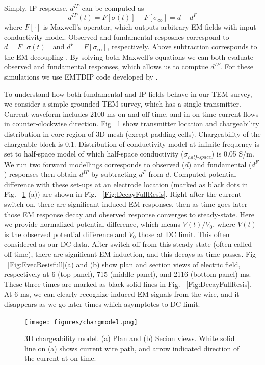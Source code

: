 \documentclass[letterpaper,11pt]{article}
\newcommand{\siginf}{\sigma_\infty}
\newcommand{\dip}{d^{IP}}
\begin{document}
Simply, IP response, $\dip$ can be computed as 
\begin{equation}
  \dip(t) = F[\sigma(t)] - F[\siginf] = d-d^F
\end{equation}
where $F[\cdot]$ is Maxwell's operator, which outputs arbitrary EM fields with input conductivity model. Observed and fundamental resposnes correspond to $d=F[\sigma(t)]$ and $d^F=F[\siginf]$, respectively. 
Above subtraction corresponds to the EM decoupling \cite[]{Pelton1978,routh2001}. By solving both Maxwell’s equations we can both evaluate observed and fundamental responses, which allows us to comptue $\dip$. For these simulations we use EMTDIP code developed by \cite{Marchant2014}. 

To understand how both fundamental and IP fields behave in our TEM survey, we consider a simple grounded TEM survey, which has a single transmitter. Current waveform includes 2100 ms on and off time, and in on-time current flows in counter-clockwise direction. Fig ~\ref{Fig:chargmodel} show transmitter location and chargeability distribution in core region of 3D mesh (except padding cells). Chargeability of the chargeable block is 0.1. Distribution of conductivity model at infinite frequency is set to half-space model of which half-space conductivity ($\sigma_{half\text{-}space}$) is 0.05 S/m. We run two forward modellings corresponds to observed ($d$) and fundamental ($d^F$) responses then obtain $\dip$ by subtracting $d^F$  from $d$. Computed potential difference with these set-ups at an electrode location (marked as black dots in Fig. ~\ref{Fig:chargmodel} (a)) are shown in Fig. ~\ref{Fig:DecayFullResis}. Right after the current switch-on, there are significant induced EM responses, then as time goes later those EM response decay and observed response converges to steady-state. Here we provide normalized potential difference, which means $V(t)/V_0$, where $V(t)$ is the observed potential difference and $V_0$ those at DC limit. This often considered as our DC data. After switch-off from this steady-state (often called off-time), there are significant EM induction, and this decays as time passes. Fig ~\ref{Fig:EvecResisfull}(a) and (b) show plan and section views of electric field, respectively at 6 (top panel), 715 (middle panel), and 2116 (bottom panel) ms. These three times are marked as black solid lines in Fig. ~\ref{Fig:DecayFullResis}. At 6 ms, we can clearly recognize induced EM signals from the wire, and it disappears as we go later times which asymptotes to DC limit. 

\begin{figure}[htb]
  \centering
  \texttt{[image: figures/chargmodel.png]}
  \caption{3D chargeability model. (a) Plan and (b) Secion views. White solid line on (a) shows current wire path, and arrow indicated direction of the current at on-time. }
  \label{Fig:chargmodel}
\end{figure}
\end{document}
